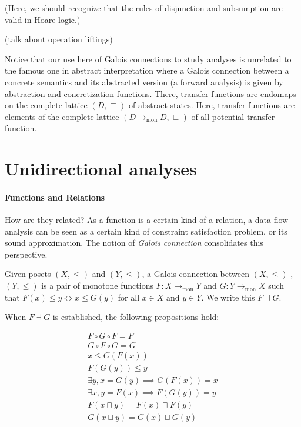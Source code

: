 \documentclass{llncs}
\newcommand{\tomon}{\to_{\mathrm{mon}}}
\newcommand{\join}{\sqcup}
\newcommand{\meet}{\sqcap}
\newcommand{\comp}{\circ}
\newcommand{\sqleq}{\sqsubseteq}
\begin{document}
(Here, we should recognize that the rules of disjunction and
subsumption are valid in Hoare logic.)

(talk about operation liftings)





Notice that our use here of Galois connections to study analyses is
unrelated to the famous one in abstract interpretation where a Galois
connection between a concrete semantics and its abstracted version (a
forward analysis) is given by abstraction and concretization
functions. There, transfer functions are endomaps on the complete
lattice $(D, \sqleq)$ of abstract states. Here, transfer functions are
elements of the complete lattice $(D \tomon D, \sqleq)$ of all
potential transfer function.


\section{Unidirectional analyses}

  \paragraph{Functions and Relations}
  How are they related?
    As a function is a certain kind of a relation,
    a data-flow analysis can be seen as a certain kind of constraint satisfaction problem, or its sound approximation.
    The notion of \emph{Galois connection} consolidates this perspective.
  
  \begin{definition}
    Given posets $(X, \leq)$ and $(Y, \leq)$, a Galois connection between $(X, \leq)$ , $(Y, \leq)$ is a pair of monotone functions $F : X \tomon Y$ and $G : Y \tomon X$ such that $F(x) \leq y \iff x \leq G(y)$ for all $x \in X$ and $y \in Y$.
    We write this $F \dashv G$.
  \end{definition}

  When $F \dashv G$ is established, the following propositions hold:

  \begin{align}
    F \comp G \comp F = F \\
    G \comp F \comp G = G \\
    x \leq G(F(x)) \\
    F(G(y)) \leq y \\
    \exists y, x = G(y) \implies G(F(x)) = x \\
    \exists x, y = F(x) \implies F(G(y)) = y \\
    F (x \meet y) = F(x) \meet F(y) \\
    G (x \join y) = G(x) \join G (y)
  \end{align}
\end{document}
